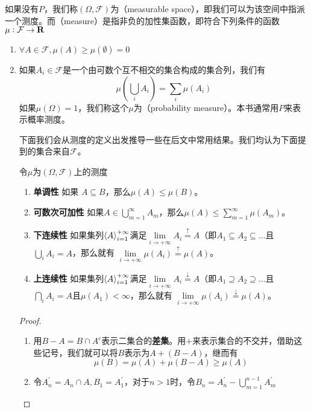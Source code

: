 \documentclass[../main.tex]{subfiles}
\begin{document}
如果没有\(P\)，我们称\((\Omega, \mathcal{F})\)为（measurable space），即我们可以为该空间中指派一个测度。而（measure）是指非负的加性集函数，即符合下列条件的函数\(\mu: \mathcal{F} \rightarrow \mathbf{R}\)
\begin{enumerate}
	\item \(\forall A \in \mathcal{F}, \mu(A) \geq \mu(\emptyset) = 0\)
	\item 如果\(A_i \in \mathcal{F}\)是一个由可数个互不相交的集合构成的集合列，我们有
	\[\mu\left(\bigcup_i A_i\right) = \sum_{i}\mu(A_i)\]
	如果\(\mu(\Omega) = 1\)，我们称这个\(\mu\)为（probability measure）。本书通常用\(P\)来表示概率测度。

	下面我们会从测度的定义出发推导一些在后文中常用结果。我们均认为下面提到的集合来自\(\mathcal{F}\)。
	\begin{theorem} \label{thm:1.1.1}
		令\(\mu\)为\((\Omega, \mathcal{F})\)上的测度
		\begin{enumerate}
			\item \label{prop:measure:monotone} \textbf{单调性} 如果 \(A \subseteq B\)，那么\(\mu(A) \leq \mu(B)\)。
			\item \textbf{可数次可加性}\label{thm:1.1.1.2} 如果\(A \in \bigcup_{m=1}^\infty A_m\)，那么\(\mu(A) \leq \sum_{m=1}^\infty\mu(A_m)\)。
			\item \label{prop:measure:below_continuity} \textbf{下连续性} %
			 如果集列\(\left<A\right>_{i=1}^{+\infty}\)满足\(\lim\limits_{i\rightarrow+\infty}A_i \stackrel{\uparrow}{=} A\)（即\(A_1 \subseteq A_2 \subseteq \dots\)且 \(\bigcup_i A_i = A\)，那么就有 \(\lim\limits_{i\rightarrow+\infty}\mu(A_i) \stackrel{\uparrow}{=} \mu(A)\)。
			\item \textbf{上连续性} 如果集列\(\left<A\right>_{i=1}^{+\infty}\)满足\(\lim\limits_{i\rightarrow+\infty}A_i \stackrel{\downarrow}{=} A\)（即\(A_1 \supseteq A_2 \supseteq \dots\)且 \(\bigcap_i A_i = A\)且\(\mu(A_1) < \infty\)，那么就有 \(\lim\limits_{i\rightarrow+\infty}\mu(A_i) \stackrel{\downarrow}{=} \mu(A)\)。
		\end{enumerate}
	\end{theorem}
	\begin{proof}
		\begin{enumerate}
			\item 用\(B-A = B\cap A^c\)表示二集合的\textbf{差集}。用\(+\)来表示集合的不交并，借助这些记号，我们就可以将\(B\)表示为\(A+(B-A)\)，继而有
			\[\mu(B) = \mu(A) + \mu(B-A) \geq \mu(A)\]
			\item 令\(A^\prime_n = A_n \cap A, B_1 = A^\prime_1\)，对于\(n > 1\)时，令\(B_n=A^\prime_n - \bigcup_{m=1}^{n-1}A^\prime_m\)

\end{enumerate}
\end{proof}
\end{enumerate}
\end{document}
